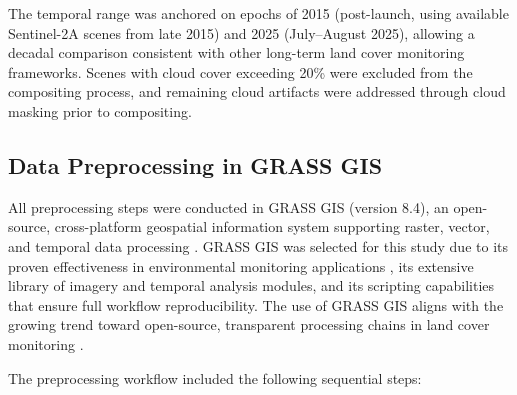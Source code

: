 \documentclass[coasts,article,submit,pdftex,moreauthors]{Definitions/mdpi}
\begin{document}
The temporal range was anchored on epochs of 2015 (post-launch, using available Sentinel-2A scenes from late 2015) and 2025 (July--August 2025), allowing a decadal comparison consistent with other long-term land cover monitoring frameworks. Scenes with cloud cover exceeding 20\% were excluded from the compositing process, and remaining cloud artifacts were addressed through cloud masking prior to compositing.

\subsection{Data Preprocessing in GRASS GIS}

All preprocessing steps were conducted in GRASS GIS (version 8.4), an open-source, cross-platform geospatial information system supporting raster, vector, and temporal data processing \citep{Neteler2012,MitasovaNeteler2004}. GRASS GIS was selected for this study due to its proven effectiveness in environmental monitoring applications \citep{Lemenkova2025Morocco}, its extensive library of imagery and temporal analysis modules, and its scripting capabilities that ensure full workflow reproducibility. The use of GRASS GIS aligns with the growing trend toward open-source, transparent processing chains in land cover monitoring \citep{Rocchini2016}.

The preprocessing workflow included the following sequential steps:
\end{document}
